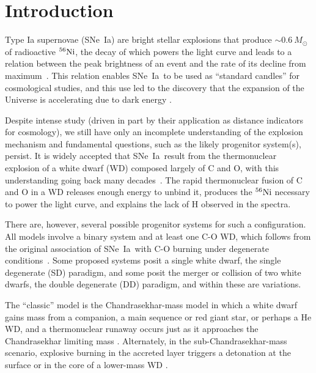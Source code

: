 \documentclass[iop,apj]{emulateapj}
\newcommand{\SNeIa}{SNe~Ia}
\newcommand{\Ni}[1]{\ensuremath{{}^{#1}{\rm Ni}}}
\newcommand{\Msun}{\ensuremath{M_\odot}}
\begin{document}
\section{Introduction}
\label{sec:intro}
Type Ia supernovae (\SNeIa) are bright stellar explosions that 
produce $\sim 0.6~\Msun$ of radioactive \Ni{56}, the decay of
which powers the light curve and leads to a relation between
the peak brightness of an event and the rate of its decline
from maximum~\citep{phillips:absolute}. This relation
enables \SNeIa\ to be used as ``standard
candles'' for cosmological studies, and this use led to 
the discovery that the expansion of the Universe is accelerating 
due to dark energy \citep{riess.filippenko.ea:observational,
perlmutter.aldering.ea:measurements,leibundgut2001}. 

Despite intense study (driven in part by their application as distance
indicators for cosmology), we still have only an incomplete
understanding of the explosion mechanism and fundamental questions,
such as the likely progenitor system(s), persist. It is widely
accepted that \SNeIa\ result from the thermonuclear explosion of a
white dwarf (WD) composed largely of C and O, with this understanding
going back many
decades~\citep{hoylefowler60,arnett.truran.ea:nucleosynthesis}. The
rapid thermonuclear fusion of C and O in a WD releases enough energy
to unbind it, produces the \Ni{56} necessary to power the light curve,
and explains the lack of H observed in the spectra.

There are, however, several possible progenitor systems for such a
configuration. All models involve a binary system and at least one C-O
WD, which follows from the original association of \SNeIa\ with C-O
burning under degenerate conditions~\citep{hoylefowler60}.
Some proposed systems posit a single white dwarf, the single
degenerate (SD) paradigm, and some posit the merger or collision of
two white dwarfs, the double degenerate (DD) paradigm, and within
these are variations.

The ``classic'' model is the Chandrasekhar-mass model in which a white
dwarf gains mass from a companion, a main sequence or red giant star,
or perhaps a He WD, and a thermonuclear runaway occurs just as it
approaches the Chandrasekhar limiting mass
\citep{hoylefowler60,trucam71,whelaniben73,Nomo84}. Alternately, in
the sub-Chandrasekhar-mass scenario, explosive burning in the accreted
layer triggers a detonation at the surface or in the core of a
lower-mass WD \citep{nomoto80,woosleyweavertaam80,simetal2010}.
\end{document}
